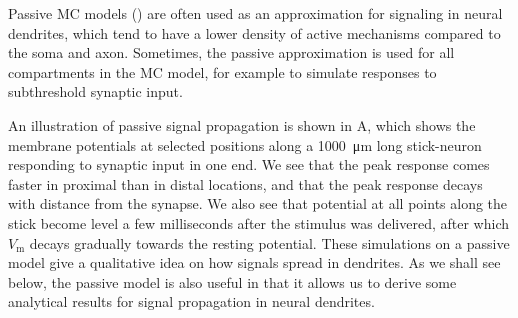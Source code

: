 Passive MC models () are often used as an approximation for signaling in neural dendrites, which tend to have a lower density of active mechanisms compared to the soma and axon. Sometimes, the passive approximation is used for all compartments in the MC model, for example to simulate responses to subthreshold synaptic input. 

An illustration of passive signal propagation is shown in A, which shows the membrane potentials at selected positions along a 1000~\si{\micro\metre} long stick-neuron responding to synaptic input in one end. We see that the peak response comes faster in proximal than in distal locations, and that the peak response decays with distance from the synapse. We also see that potential at all points along the stick become level a few milliseconds after the stimulus was delivered, after which $V_\mathrm{m}$ decays gradually towards the resting potential. These simulations on a passive model give a qualitative idea on how signals spread in dendrites. As we shall see below, the passive model is also useful in that it allows us to derive some analytical results for signal propagation in neural dendrites.


